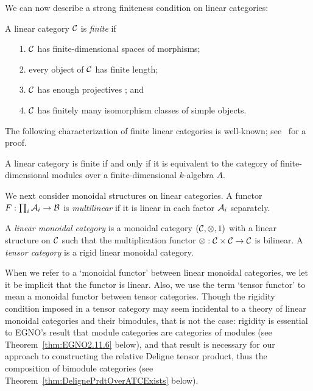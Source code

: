 \documentclass{amsart}
\begin{document}
We can now describe a strong finiteness condition on linear categories:
\begin{definition} %
	A linear category $\mathcal C$ is {\em finite} if 
	\begin{enumerate}
		\item[1.] $\mathcal C$ has finite-dimensional spaces of morphisms;
		\item[2.] every object of $\mathcal C$ has finite length;
		\item[3.] $\mathcal C$ has enough projectives%
		; and
		\item[4.] $\mathcal C$ has finitely many isomorphism classes of simple objects.  
	\end{enumerate}
\end{definition}

The following characterization of finite linear categories is well-known; see~\cite{BTP} for a proof.
\begin{proposition} \label{prop:catismod}
A linear category is finite if and only if it is equivalent to the category of finite-dimensional modules over a finite-dimensional $k$-algebra $A$.
\end{proposition}


We next consider monoidal structures on linear categories.  A functor $F: \prod_i \mathcal A_i \to \mathcal B$ is \emph{multilinear} if it is linear in each factor $\mathcal A_i$ separately.

\begin{definition}
A \emph{linear monoidal category} is a monoidal category $(\mathcal C, \otimes, 1)$ with a linear structure on $\mathcal C$ such that the multiplication functor $\otimes: \mathcal C \times \mathcal C \rightarrow \mathcal C$ is bilinear.  A \emph{tensor category} is a rigid linear monoidal category.
\end{definition}
\nid When we refer to a `monoidal functor' between linear monoidal categories, we let it be implicit that the functor is linear.  Also, we use the term `tensor functor' to mean a monoidal functor between tensor categories.  Though the rigidity condition imposed in a tensor category may seem incidental to a theory of linear monoidal categories and their bimodules, that is not the case: rigidity is essential to EGNO's result that module categories are categories of modules (see Theorem~\ref{thm:EGNO2.11.6} below), and that result is necessary for our approach to constructing the relative Deligne tensor product, thus the composition of bimodule categories (see Theorem~\ref{thm:DelignePrdtOverATCExists} below).
\end{document}

